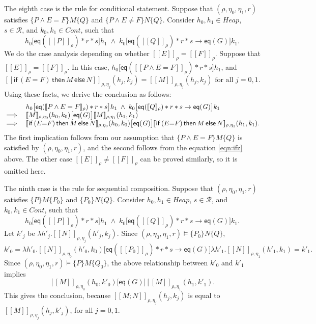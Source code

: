 \documentclass{LMCS}
\newcommand{\ifz}{\mathsf{if}}
\newcommand{\Heap}{\mathit{Heap}}
\newcommand{\Good}{\mathit{G}}
\newcommand{\cR}{\mathcal{R}}
\newcommand{\cont}{\mathit{Cont}}
\newcommand{\ff}[1]{[\![#1]\!]}
\newcommand{\mtri}[3]{\{{#1}\}{#2}\{{#3}\}}
\newcommand{\EQ}{\mathsf{eq}}
\newcommand{\then}{\mathsf{then}}
\newcommand{\melse}{\mathsf{else}}
\begin{document}
The eighth case is the rule for conditional statement.
Suppose that $(\rho,\eta_0,\eta_1,r)$ satisfies 
$\mtri{P \wedge E=F}{M}{Q}$ and 
$\mtri{P \wedge E\not=F}{N}{Q}$. Consider
$h_0,h_1 \in \Heap$, $s \in\cR$,
and $k_0,k_1 \in \cont$, such that
$$
   h_0\bigl[\EQ(\ff{P}_\rho)*r*s\bigr]h_1\;\wedge\;
   k_0\bigl[\EQ(\ff{Q}_\rho)*r*s \rightarrow \EQ(\Good)\bigr]k_1.
$$
We do the case analysis depending on whether $\ff{E}_\rho = \ff{F}_\rho$.
Suppose that $\ff{E}_\rho = \ff{F}_\rho$. In this case,
$h_0\bigl[\EQ(\ff{P \wedge E=F}_\rho)*r*s\bigr]h_1$,
and
\begin{equation}\label{eqn:ifz}
   \ff{\ifz\,(E{=}F)\,\then\,M\,\melse\,N}_{\rho,\eta_j}(h_j,k_j) = 
   \ff{M}_{\rho,\eta_j}(h_j,k_j) \mbox{ for all $j=0,1$}.
\end{equation}
Using these facts, we derive the conclusion as follows:
$$
\begin{array}{@{}ll@{}}
&
   h_0\bigl[\EQ(\ff{P \wedge E=F}_\rho)*r*s\bigr]h_1 \;\wedge\;
   k_0\bigl[\EQ(\ff{Q}_\rho)*r*s \rightarrow \EQ(\Good)\bigr]k_1
\\
\implies &
   \ff{M}_{\rho,\eta_0}(h_0,k_0)
   \bigl[\EQ(\Good)\bigr]
   \ff{M}_{\rho,\eta_1}(h_1,k_1)
\\
\implies &
   \ff{\ifz\,(E{=}F)\,\then\,M\,\melse\,N}_{\rho,\eta_0}(h_0,k_0)  
   \bigl[\EQ(\Good)\bigr]
   \ff{\ifz\,(E{=}F)\,\then\,M\,\melse\,N}_{\rho,\eta_1}(h_1,k_1) .
\end{array}
$$
The first implication follows from our assumption that 
$\mtri{P \wedge E=F}{M}{Q}$ is satisfied by
$(\rho,\eta_0,\eta_1,r)$, 
and the second follows from the equation
\ref{eqn:ifz} above. The other case $\ff{E}_\rho \not= \ff{F}_\rho$
can be proved similarly, so it is omitted here.

The ninth case is the rule for sequential composition.
Suppose that $(\rho,\eta_0,\eta_1,r)$ satisfies
$\mtri{P}{M}{P_0}$ and $\mtri{P_0}{N}{Q}$. Consider
$h_0,h_1 \in \Heap$, $s \in\cR$,
and $k_0,k_1 \in \cont$, such that
$$
   h_0\bigl[\EQ(\ff{P}_\rho)*r*s\bigr]h_1\;\wedge\;
   k_0\bigl[\EQ(\ff{Q}_\rho)*r*s \rightarrow \EQ(\Good)\bigr]k_1.
$$
Let $k'_j$ be $\lambda h'_j.\ff{N}_{\rho,\eta_j}(h'_j,k_j)$.
Since $(\rho,\eta_0,\eta_1,r) \models \mtri{P_0}{N}{Q}$,
$$
  k'_0 = \lambda h'_0.\ff{N}_{\rho,\eta_0}(h'_0,k_0)
  \bigl[\EQ(\ff{P_0}_\rho)*r*s \rightarrow \EQ(\Good)\bigr]
  \lambda h'_1.\ff{N}_{\rho,\eta_1}(h'_1,k_1) = k'_1.
$$
Since $(\rho,\eta_0,\eta_1,r) \models \mtri{P}{M}{Q_0}$,
the above relationship between $k'_0$ and $k'_1$ implies
$$
\ff{M}_{\rho,\eta_0}(h_0,k'_0)
  \bigl[\EQ(\Good)\bigr]
  \ff{M}_{\rho,\eta_1}(h_1,k'_1).
$$ 
This
gives the conclusion, because
$\ff{M;N}_{\rho,\eta_j}(h_j,k_j)$ is
equal to
$\ff{M}_{\rho,\eta_j}(h_j,k'_j)$, for all $j=0,1$.
\end{document}
